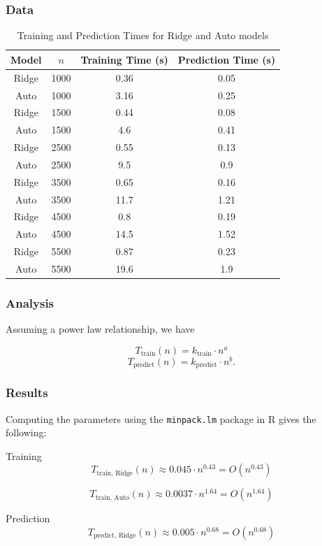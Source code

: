 \documentclass[12pt, twoside,hidelinks]{article}
\theoremstyle{definition}
\numberwithin{equation}{section}
\begin{document}
\subsubsection*{Data}
\begin{table}[h!]
\centering
\begin{tabular}{|c|c|c|c|}
\hline
Model & $n$ & Training Time (s) & Prediction Time (s) \\
\hline
Ridge & 1000 & 0.36 & 0.05 \\
Auto & 1000 & 3.16 & 0.25 \\
Ridge & 1500 & 0.44 & 0.08 \\
Auto & 1500 & 4.6 & 0.41 \\
Ridge & 2500 & 0.55 & 0.13 \\
Auto & 2500 & 9.5 & 0.9 \\
Ridge & 3500 & 0.65 & 0.16 \\
Auto & 3500 & 11.7 & 1.21 \\
Ridge & 4500 & 0.8 & 0.19 \\
Auto & 4500 & 14.5 & 1.52 \\
Ridge & 5500 & 0.87 & 0.23 \\
Auto & 5500 & 19.6 & 1.9 \\
\hline
\end{tabular}
\caption{Training and Prediction Times for Ridge and Auto models}
\end{table}

\subsubsection*{Analysis}
Assuming a power law relationship, we have

\[
T_{\text{train}}(n) = k_{\text{train}} \cdot n^{a}
\]
\[
T_{\text{predict}}(n) = k_{\text{predict}} \cdot n^{b}.
\]

\subsubsection{Results} 

Computing the parameters using the \texttt{minpack.lm} package in R gives the following:
\newline

Training 
\[
T_{\text{train, Ridge}}(n) \approx 0.045 \cdot n^{0.43} = O(n^{0.43})
\]

\[
T_{\text{train, Auto}}(n) \approx 0.0037 \cdot n^{1.64} = O(n^{1.64})
\]

Prediction 
\newline
\[
T_{\text{predict, Ridge}}(n) \approx 0.005 \cdot n^{0.68} = O(n^{0.68})
\]
\end{document}
